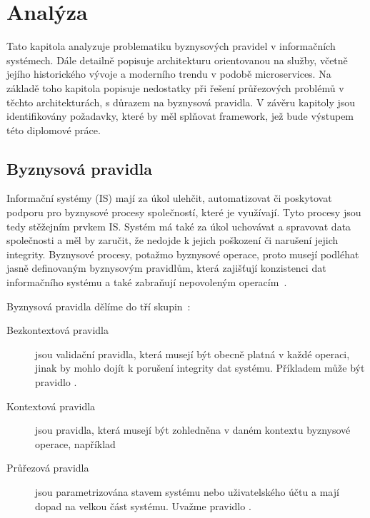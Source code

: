 \usepackage[T1]{fontenc}
\usepackage[utf8]{inputenc}
\usepackage{graphicx}


\chapter{Analýza}\label{ch:analyza}

Tato kapitola analyzuje problematiku byznysových pravidel v informačních systémech.
Dále detailně popisuje architekturu orientovanou na služby, včetně jejího historického
vývoje a moderního trendu v podobě microservices. Na základě toho kapitola popisuje nedostatky
při řešení průřezových problémů v těchto architekturách, s důrazem na byznysová pravidla.
V závěru kapitoly jsou identifikovány požadavky, které by měl splňovat framework,
jež bude výstupem této diplomové práce.

\section{Byznysová pravidla}

Informační systémy (IS) mají za úkol ulehčit, automatizovat či poskytovat podporu pro
byznysové procesy společností, které je využívají. Tyto procesy jsou tedy stěžejním
prvkem IS. Systém má také za úkol uchovávat a spravovat data společnosti
a měl by zaručit, že nedojde k jejich poškození či narušení jejich integrity.
Byznysové procesy, potažmo byznysové operace, proto musejí
podléhat jasně definovaným byznysovým pravidlům, která zajišťují konzistenci dat informačního
systému a také zabraňují nepovoleným operacím~\cite{cemus2015automated}.

Byznysová pravidla dělíme do tří skupin~\cite{cemus2014aspect}:
\begin{description}
    \item [Bezkontextová pravidla] jsou validační pravidla, která musejí být obecně platná
    v každé operaci, jinak by mohlo dojít k porušení integrity dat systému. Příkladem může
    být pravidlo .
    \item [Kontextová pravidla] jsou pravidla, která musejí být zohledněna v daném kontextu
    byznysové operace, například 
    \item [Průřezová pravidla] jsou parametrizována stavem systému nebo uživatelského účtu a mají
    dopad na velkou část systému. Uvažme pravidlo .
\end{description}

